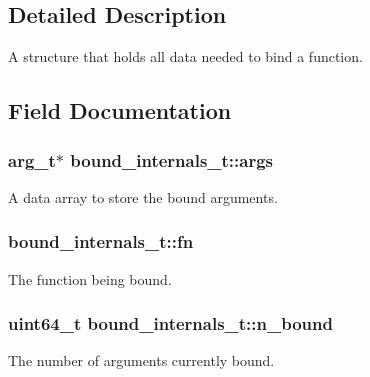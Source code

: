 \subsection{Detailed Description}
A structure that holds all data needed to bind a function. 

\subsection{Field Documentation}
\subsubsection[{\texorpdfstring{args}{args}}]{\setlength{\rightskip}{0pt plus 5cm}arg\+\_\+t$\ast$ bound\+\_\+internals\+\_\+t\+::args}\hypertarget{structbound__internals__t_a84757175e6e08d7364e8aad728e49985}{}\label{structbound__internals__t_a84757175e6e08d7364e8aad728e49985}


A data array to store the bound arguments. 

\subsubsection[{\texorpdfstring{fn}{fn}}]{ bound\+\_\+internals\+\_\+t\+::fn}\hypertarget{structbound__internals__t_ac9b29b4f9b69674cef9fb3d083b92521}{}\label{structbound__internals__t_ac9b29b4f9b69674cef9fb3d083b92521}


The function being bound. 

\subsubsection[{\texorpdfstring{n\+\_\+bound}{n_bound}}]{\setlength{\rightskip}{0pt plus 5cm}uint64\+\_\+t bound\+\_\+internals\+\_\+t\+::n\+\_\+bound}\hypertarget{structbound__internals__t_aa959691320a507b149ff25164740a323}{}\label{structbound__internals__t_aa959691320a507b149ff25164740a323}


The number of arguments currently bound. 

